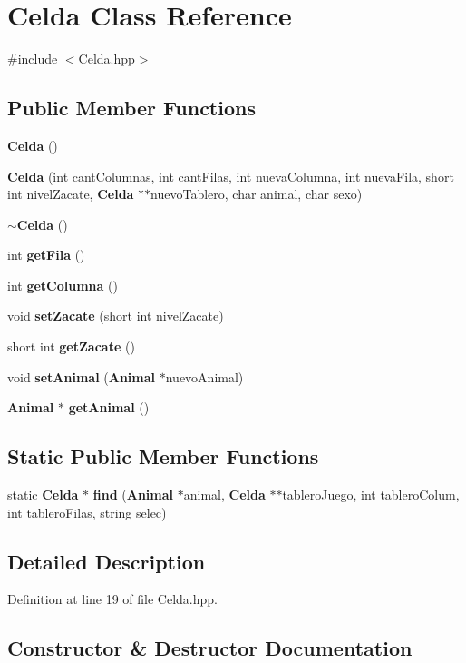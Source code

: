 \section{Celda Class Reference}
\label{class_celda}


{\ttfamily \#include $<$Celda.\+hpp$>$}

\subsection*{Public Member Functions}
\begin{DoxyCompactItemize}
\item 
{\bf Celda} ()
\item 
{\bf Celda} (int cant\+Columnas, int cant\+Filas, int nueva\+Columna, int nueva\+Fila, short int nivel\+Zacate, {\bf Celda} $\ast$$\ast$nuevo\+Tablero, char animal, char sexo)
\item 
{\bf $\sim$\+Celda} ()
\item 
int {\bf get\+Fila} ()
\item 
int {\bf get\+Columna} ()
\item 
void {\bf set\+Zacate} (short int nivel\+Zacate)
\item 
short int {\bf get\+Zacate} ()
\item 
void {\bf set\+Animal} ({\bf Animal} $\ast$nuevo\+Animal)
\item 
{\bf Animal} $\ast$ {\bf get\+Animal} ()
\end{DoxyCompactItemize}
\subsection*{Static Public Member Functions}
\begin{DoxyCompactItemize}
\item 
static {\bf Celda} $\ast$ {\bf find} ({\bf Animal} $\ast$animal, {\bf Celda} $\ast$$\ast$tablero\+Juego, int tablero\+Colum, int tablero\+Filas, string selec)
\end{DoxyCompactItemize}


\subsection{Detailed Description}


Definition at line 19 of file Celda.\+hpp.



\subsection{Constructor \& Destructor Documentation}
